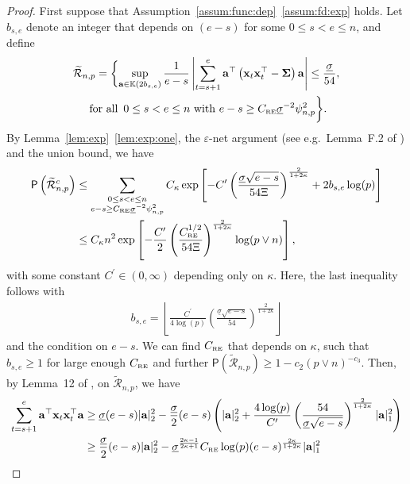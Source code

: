 \documentclass[11pt, a4paper]{article}
\newcommand{\mbf}{\mathbf}
\newcommand{\mc}{\mathcal}
\renewcommand{\l}{\left}
\renewcommand{\r}{\right}
\def\wt{\widetilde}
\newcommand{\p}{\mathsf{P}}
\newcommand{\nn}{\nonumber}
\newcommand{\crsc}{C_{\text{\tiny \upshape RE}}}
\theoremstyle{definition}
\theoremstyle{definition}
\theoremstyle{definition}
\theoremstyle{definition}
\theoremstyle{definition}
\theoremstyle{remark}
\theoremstyle{definition}
\theoremstyle{definition}
\theoremstyle{definition}
\begin{document}
\begin{proof}
	First suppose that Assumption~\ref{assum:func:dep}~\ref{assum:fd:exp} holds.
	Let $b_{s, e}$ denote an integer that depends on $(e - s)$ for some $0 \le s < e \le n$, and define
	\begin{multline*}
	\wt{\mc R}_{n, p} = \biggl\{ \sup_{\mbf a \in \mathbb{K}(2b_{s, e})} \frac{1}{e - s} \l\vert \sum_{t = s + 1}^e \mbf a^\top\l(\mbf x_t\mbf x_t^\top - \bm\Sigma\r) \mbf a \r\vert \le \frac{\underline{\sigma}}{54},  \\ 
	\text{ for all }\, 0 \le s < e \le n \text{ with } e - s \ge \crsc \underline{\sigma}^{-2}\psi_{n, p}^2 \biggr\}.
	\end{multline*}
	By Lemma~\ref{lem:exp}~\ref{lem:exp:one}, the $\varepsilon$-net argument (see e.g.\ Lemma~F.2 of \citealp{basu2015regularized}) and the union bound,
	we have
	\begin{align}
	\p\l( \wt{\mc R}_{n, p}^c \r) &\le 
	\sum_{\substack{0 \le s < e \le n \\ e - s \ge \crsc \underline{\sigma}^{-2} \psi_{n, p}^2}}
	C_\kappa \exp\l[ - C^\prime \l(\frac{\underline{\sigma}\sqrt{e - s}}{54 \Xi}\r)^{\frac{2}{1 + 2 \kappa}} + 2 b_{s, e} \log(p) \r]
	\nn \\
	&\le C_\kappa n^2 \exp\l[ -\frac{C^\prime}{2} \l(\frac{\crsc^{1/2}}{54 \Xi} \r)^{\frac{2}{1 + 2\kappa}} \log(p \vee n) \r],
	\nn
	\end{align}
	with some constant $C^\prime \in (0, \infty)$ depending only on $\kappa$.
	Here, the last inequality follows with 
	\begin{align*}
	b_{s, e} = \l\lfloor \frac{C^\prime}{4\log(p)}\l(\frac{ \underline{\sigma}\sqrt{e - s} }{54}\r)^{\frac{2}{1 + 2\kappa}} \r\rfloor
	\end{align*}
	and the condition on $e -s$. 
	We can find $\crsc$ that depends on $\kappa$, such that $b_{s, e}  \ge 1$ for large enough $\crsc$ and further $\p(\wt{\mc R}_{n, p}) \ge 1 - c_2(p \vee n)^{-c_3}$.
	Then, by Lemma~12 of \cite{loh2012high}, on $\wt{\mc R}_{n, p}$, we have
	\begin{align*}
	\sum_{t = s + 1}^e \mbf a^\top \mbf x_t \mbf x_t^\top \mbf a 
	& \ge \underline{\sigma} (e - s) \vert \mbf a \vert_2^2 - \frac{\underline{\sigma}}{2} (e - s) \l( \vert \mbf a \vert_2^2 + \frac{4\log(p)}{C^\prime} \l(\frac{54}{ \underline{\sigma} \sqrt{e - s} }\r)^{\frac{2}{1 + 2\kappa}} \vert \mbf a \vert_1^2 \r)
	\\
	& \ge \frac{\underline{\sigma}}{2} (e - s) \vert \mbf a \vert_2^2 - \underline{\sigma}^{\frac{2\kappa - 1}{2\kappa + 1}} \crsc \log(p) (e - s)^{\frac{2\kappa}{1 + 2\kappa}} \vert \mbf a \vert_1^2

\end{align*}
\end{proof}
\end{document}
